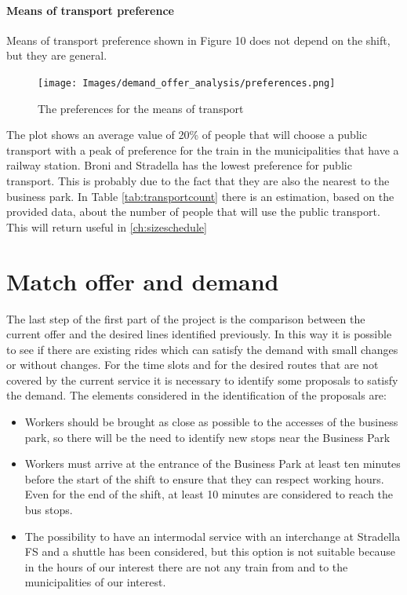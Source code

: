 \paragraph{Means of transport preference}
Means of transport preference shown in Figure 10 does not depend on the shift, but they are general. 

\begin{figure}[h]
    \centering
    \texttt{[image: Images/demand\_offer\_analysis/preferences.png]}
    \caption{The preferences for the means of transport}
    \label{fig:meantransport}
\end{figure}

The plot shows an average value of 20\% of people that will choose a public transport  with a peak of preference for the train in the municipalities that have a railway station.
Broni and Stradella has the lowest preference for public transport. This is probably due to the fact that they are also the nearest to the business park.
In Table \ref{tab:transportcount} there is an estimation, based on the provided data, about the number of people that will use the public transport. This will return useful in \ref{ch:sizeschedule}
\newpage

\newpage

\section{Match offer and demand}

The last step of the first part of the project is the comparison between the current offer and the desired lines identified previously. In this way it is possible to see if there are existing rides which can satisfy the demand with small changes or without changes. For the time slots and for the desired routes that are not covered by the current service it is necessary to identify some proposals to satisfy the demand.
The elements considered in the identification of the proposals are:
\begin{itemize}
    \item Workers should be brought as close as possible to the accesses of the business park, so there will be the need to identify new stops near the Business Park
    \item Workers must arrive at the entrance of the Business Park at least ten minutes before the start of the shift to ensure that they can respect working hours. Even for the end of the shift, at least 10 minutes are considered to reach the bus stops.
    \item The possibility to have an intermodal service with an interchange at Stradella FS and a shuttle has been considered, but this option is not suitable because in the hours of our interest there are not any train from and to the municipalities of our interest.
\end{itemize}

